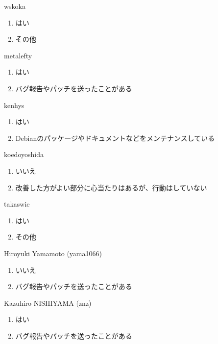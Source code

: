 \begin{prework}{ wskoka }
  \begin{enumerate}
  \item はい
  \item その他
  \end{enumerate}
\end{prework}

\begin{prework}{ metalefty }
  \begin{enumerate}
  \item はい
  \item バグ報告やパッチを送ったことがある
  \end{enumerate}
\end{prework}

\begin{prework}{ kenhys }
  \begin{enumerate}
  \item はい
  \item Debianのパッケージやドキュメントなどをメンテナンスしている
  \end{enumerate}
\end{prework}

\begin{prework}{ koedoyoshida }
  \begin{enumerate}
  \item いいえ
  \item 改善した方がよい部分に心当たりはあるが、行動はしていない
  \end{enumerate}
\end{prework}

\begin{prework}{ takaswie }
  \begin{enumerate}
  \item はい
  \item その他
  \end{enumerate}
\end{prework}

\begin{prework}{ Hiroyuki Yamamoto (yama1066) }
  \begin{enumerate}
  \item いいえ
  \item バグ報告やパッチを送ったことがある
  \end{enumerate}
\end{prework}

\begin{prework}{ Kazuhiro NISHIYAMA (znz) }
  \begin{enumerate}
  \item はい
  \item バグ報告やパッチを送ったことがある
  \end{enumerate}
\end{prework}


